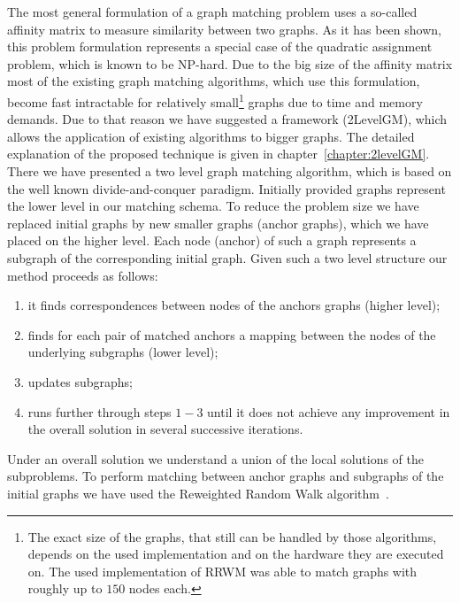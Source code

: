 The most general formulation of a graph matching problem uses a so-called affinity matrix to measure similarity between two graphs. 
As it has been shown, this problem formulation represents a special case of the quadratic assignment problem, which is known to be NP-hard. Due to the big size of the affinity matrix most of the existing graph matching algorithms, which use this formulation, become fast intractable for relatively small\footnote{The exact size of the graphs, that still can be handled by those algorithms, depends on the used implementation and on the hardware they are executed on. The used implementation of RRWM was able to match graphs with roughly up to $150$ nodes each.} graphs due to time and memory demands. Due to that reason we have suggested a framework (2LevelGM), which allows the application of existing algorithms to bigger graphs. The detailed explanation of the proposed technique is given in chapter~\ref{chapter:2levelGM}. There we have presented a two level graph matching algorithm, which is based on the well known divide-and-conquer paradigm. Initially provided graphs represent the lower level in our matching schema. To reduce the problem size we have replaced initial graphs by new smaller graphs (anchor graphs), which we have placed on the higher level. Each node (anchor) of such a graph represents a subgraph of the corresponding initial graph. Given such a two level structure our method proceeds as follows:
\begin{enumerate}
\item it finds correspondences between nodes of the anchors graphs (higher level);
\item finds for each pair of matched anchors a mapping between the nodes of the underlying subgraphs (lower level);
\item updates subgraphs;
\item runs further through steps $1-3$ until it does not achieve any improvement in the overall solution in several successive iterations.
\end{enumerate}
Under an overall solution we understand a union of the local solutions of the subproblems. To perform matching between anchor graphs and subgraphs of the initial graphs we have used the Reweighted Random Walk algorithm~\cite{Cho2010_RRWM}.

